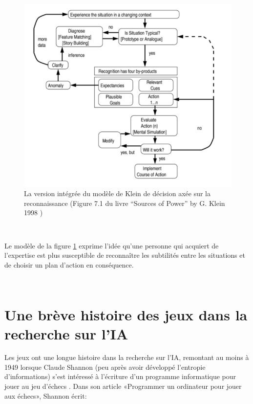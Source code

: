 \begin{figure}[th]
\centering
\includegraphics{Figures/klein.PNG}
\decoRule
\caption[ La version intégrée  du modèle de Klein de décision axée sur la reconnaissance] { La version intégrée  du modèle de Klein de décision axée sur la reconnaissance
(Figure 7.1 du livre “Sources of Power” by G. Klein 1998 \parencite{klein2017sources}) }
\label{fig:klein}
\end{figure}


~\par
Le modèle de la figure \ref{fig:klein} exprime l’idée qu’une personne qui acquiert de l’expertise est plus susceptible 
de reconnaître les subtilités entre les situations et de choisir un plan d’action en conséquence.



~\par

\section{Une brève histoire des jeux dans la recherche sur l'IA}

Les jeux ont une longue histoire dans la recherche sur l'IA, remontant au moins à 1949 lorsque Claude Shannon (peu après avoir développé l'entropie d'informations) s'est intéressé à l'écriture d'un programme informatique pour jouer au jeu d'échecs \parencite{unity2}. Dans son article «Programmer un ordinateur pour jouer aux échecs», Shannon écrit:

